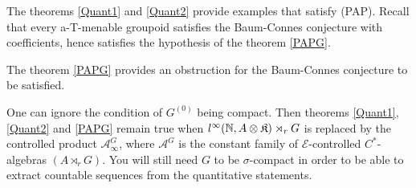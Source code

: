 \begin{rk}
The theorems \ref{Quant1} and \ref{Quant2} provide examples that satisfy (PAP). Recall that every a-T-menable groupoid satisfies the Baum-Connes conjecture with coefficients, hence satisfies the hypothesis of the theorem \ref{PAPG}.
\end{rk}

\begin{rk}
The theorem \ref{PAPG} provides an obstruction for the Baum-Connes conjecture to be satisfied. 
\end{rk}

\begin{rk} One can ignore the condition of $G^{(0)}$ being compact. Then theorems \ref{Quant1}, \ref{Quant2} and \ref{PAPG} remain true when $l^\infty(\mathbb N, A\otimes\mathfrak K)\rtimes_r G$ is replaced by the controlled product $\mathcal A^G_\infty$, where $\mathcal A^G$ is the constant family of $\mathcal E$-controlled $C^*$-algebras $(A\rtimes_r G)$. You will still need $G$ to be $\sigma$-compact in order to be able to extract countable sequences from the quantitative statements.
\end{rk}
